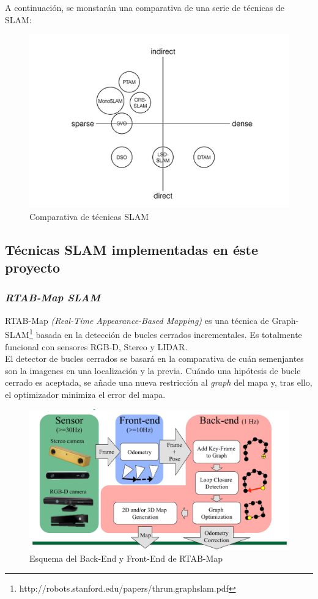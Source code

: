\begin{itemize}
A continuación, se monstarán una comparativa de una serie de técnicas de SLAM:
\begin{figure}[h!]
    \centering
    \includegraphics[width=.6\textwidth]{images/comp_slam}
    \caption{Comparativa de técnicas SLAM}
\end{figure}

\end{itemize}

\subsection{Técnicas SLAM implementadas en éste proyecto}
\subsubsection{\textit{RTAB-Map SLAM}}
RTAB-Map \textit{(Real-Time Appearance-Based Mapping)} es una técnica de Graph-SLAM\footnote{http://robots.stanford.edu/papers/thrun.graphslam.pdf} basada en la detección de bucles cerrados incrementales. Es totalmente funcional 
con sensores RGB-D, Stereo y LIDAR. \\
El detector de bucles cerrados se basará en la comparativa de cuán semenjantes son la imagenes en una localización y la previa. Cuándo una hipótesis 
de bucle cerrado es aceptada, se añade una nueva restricción al \textit{graph} del mapa y, tras ello, el optimizador minimiza el error del mapa. \\

\begin{figure}[h!]
    \centering
    \includegraphics[width=.7\textwidth]{images/rtabmap_scheme}
    \caption{Esquema del Back-End y Front-End de RTAB-Map}
\end{figure}


